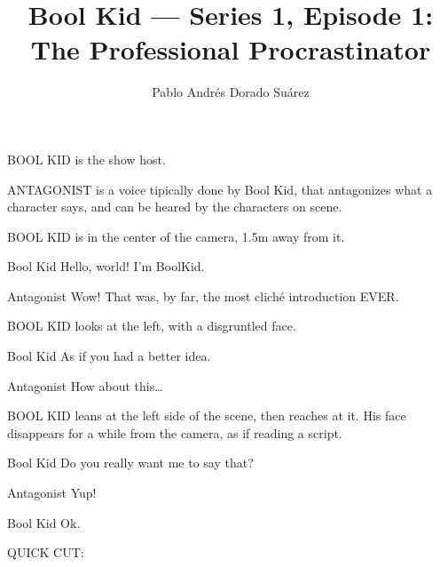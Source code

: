 \documentclass{screenplay}[2018/01/07]
\title{Bool Kid — Series 1, Episode 1: The Professional Procrastinator}
\author{Pablo Andrés Dorado Suárez}
\begin{document}
    \coverpage

    \fadein
    BOOL KID is the show host.

    ANTAGONIST is a voice tipically done by Bool Kid, that antagonizes what a character says, and can be heared by the characters on scene.

    \vspace{1em}
    \vspace{2em}


    BOOL KID is in the center of the camera, 1.5m away from it.

    \begin{dialogue}{Bool Kid}
        Hello, world! I'm BoolKid.
    \end{dialogue}

    \begin{dialogue}{Antagonist}
        Wow! That was, by far, the most cliché introduction EVER.
    \end{dialogue}

    BOOL KID looks at the left, with a disgruntled face.

    \begin{dialogue}{Bool Kid}
        As if you had a better idea.
    \end{dialogue}

    \begin{dialogue}{Antagonist}
        How about this\dots
    \end{dialogue}

    BOOL KID leans at the left side of the scene, then reaches at it. His face disappears for a while from the camera, as if reading a script.

    \begin{dialogue}{Bool Kid}
        Do you really want me to say that?
    \end{dialogue}

    \begin{dialogue}{Antagonist}
        Yup!
    \end{dialogue}

    \begin{dialogue}[sighing]{Bool Kid}
        Ok.
    \end{dialogue}

    \begin{flushright}
        QUICK CUT:
    \end{flushright}
\end{document}

